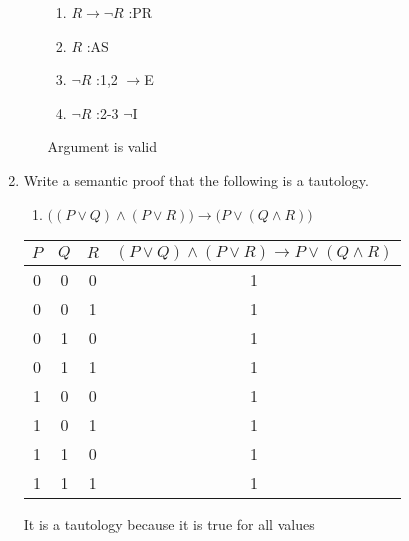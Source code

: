 \documentclass[12pt]{article}
\newcommand{\answer}[1]{%
  \par\noindent
  \begin{tcolorbox}[colback=gray!10, colframe=gray!80, title=Proof]
    #1
  \end{tcolorbox}
}
\begin{document}
\begin{enumerate}
\begin{enumerate}
{\begin{enumerate}[label=\arabic*.]
          \item $R\rightarrow\lnot R$ :PR
          \item \qquad $R$ :AS
          \item \qquad $\lnot R$ :1,2 $\rightarrow$E
          \item $\lnot R$ :2-3 $\lnot$I
        \end{enumerate}

        Argument is valid
      }
  \end{enumerate}
  \item Write a semantic proof that the following is a tautology.
    \begin{enumerate}
      \item $\big( ( P \vee Q) \wedge (P \vee R) \big) \rightarrow \big (P \vee (Q \wedge R) \big ) $
    \end{enumerate}
    \answer{

      \begin{tabular}{|c|c|c|c|}
          \hline
          $P$ & $Q$ & $R$ & $(P\vee Q)\wedge(P\vee R)\rightarrow P\vee (Q\wedge R)$ \\ \hline
          0 & 0 & 0 & 1 \\ \hline
          0 & 0 & 1 & 1 \\ \hline
          0 & 1 & 0 & 1 \\ \hline
          0 & 1 & 1 & 1 \\ \hline
          1 & 0 & 0 & 1 \\ \hline
          1 & 0 & 1 & 1 \\ \hline
          1 & 1 & 0 & 1 \\ \hline
          1 & 1 & 1 & 1 \\ \hline
      \end{tabular}
      \smallbreak
      It is a tautology because it is true for all values

}
\end{enumerate}
\end{document}
